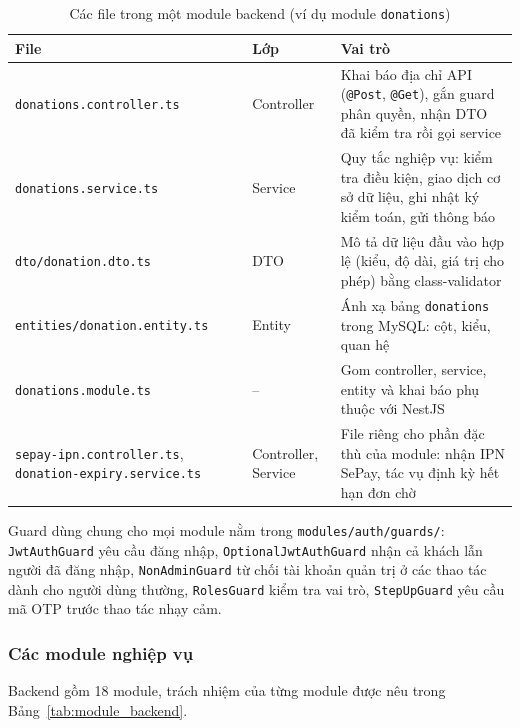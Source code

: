 \begin{table}[htbp]
    \centering
    \small
    \caption{Các file trong một module backend (ví dụ module \texttt{donations})}
    \label{tab:module_files}
    \begin{tabularx}{\textwidth}{|P{4.6cm}|P{2.0cm}|X|}
        \hline
        \textbf{File} & \textbf{Lớp} & \textbf{Vai trò} \\
        \hline
        \texttt{donations.controller.ts} & Controller & Khai báo địa chỉ API (\texttt{@Post}, \texttt{@Get}), gắn guard phân quyền, nhận DTO đã kiểm tra rồi gọi service \\
        \hline
        \texttt{donations.service.ts} & Service & Quy tắc nghiệp vụ: kiểm tra điều kiện, giao dịch cơ sở dữ liệu, ghi nhật ký kiểm toán, gửi thông báo \\
        \hline
        \texttt{dto/donation.dto.ts} & DTO & Mô tả dữ liệu đầu vào hợp lệ (kiểu, độ dài, giá trị cho phép) bằng class-validator \\
        \hline
        \texttt{entities/donation.entity.ts} & Entity & Ánh xạ bảng \texttt{donations} trong MySQL: cột, kiểu, quan hệ \\
        \hline
        \texttt{donations.module.ts} & -- & Gom controller, service, entity và khai báo phụ thuộc với NestJS \\
        \hline
        \texttt{sepay-ipn.controller.ts}, \texttt{donation-expiry.service.ts} & Controller, Service & File riêng cho phần đặc thù của module: nhận IPN SePay, tác vụ định kỳ hết hạn đơn chờ \\
        \hline
    \end{tabularx}
\end{table}

Guard dùng chung cho mọi module nằm trong \texttt{modules/auth/guards/}: \texttt{JwtAuthGuard} yêu cầu đăng nhập, \texttt{OptionalJwtAuthGuard} nhận cả khách lẫn người đã đăng nhập, \texttt{NonAdminGuard} từ chối tài khoản quản trị ở các thao tác dành cho người dùng thường, \texttt{RolesGuard} kiểm tra vai trò, \texttt{StepUpGuard} yêu cầu mã OTP trước thao tác nhạy cảm.

\subsubsection{Các module nghiệp vụ}

Backend gồm 18 module, trách nhiệm của từng module được nêu trong Bảng~\ref{tab:module_backend}.

